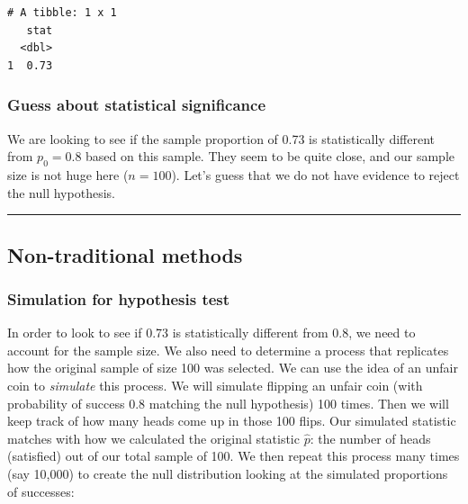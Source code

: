 \documentclass[12pt, krantz2,]{krantz}
\begin{document}
\begin{verbatim}
# A tibble: 1 x 1
   stat
  <dbl>
1  0.73
\end{verbatim}

\hypertarget{guess-about-statistical-significance-1}{%
\subsubsection*{Guess about statistical significance}\label{guess-about-statistical-significance-1}}


We are looking to see if the sample proportion of 0.73 is statistically different from \(p_0 = 0.8\) based on this sample. They seem to be quite close, and our sample size is not huge here (\(n = 100\)). Let's guess that we do not have evidence to reject the null hypothesis.

\begin{center}\rule{0.5\linewidth}{\linethickness}\end{center}

\hypertarget{non-traditional-methods-1}{%
\subsection{Non-traditional methods}\label{non-traditional-methods-1}}

\hypertarget{simulation-for-hypothesis-test}{%
\subsubsection*{Simulation for hypothesis test}\label{simulation-for-hypothesis-test}}


In order to look to see if 0.73 is statistically different from 0.8, we need to account for the sample size. We also need to determine a process that replicates how the original sample of size 100 was selected. We can use the idea of an unfair coin to \emph{simulate} this process. We will simulate flipping an unfair coin (with probability of success 0.8 matching the null hypothesis) 100 times. Then we will keep track of how many heads come up in those 100 flips. Our simulated statistic matches with how we calculated the original statistic \(\hat{p}\): the number of heads (satisfied) out of our total sample of 100. We then repeat this process many times (say 10,000) to create the null distribution looking at the simulated proportions of successes:
\end{document}
